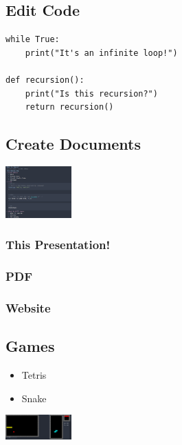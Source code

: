\documentclass[11pt]{article}
\begin{document}
\subsection*{Edit Code}
\label{sec:orgff2bdde}
\begin{verbatim}
while True:
    print("It's an infinite loop!")

def recursion():
    print("Is this recursion?")
    return recursion()
\end{verbatim}
\subsection*{Create Documents}
\label{sec:org5b7b97a}
\begin{center}
\includegraphics[width=1in]{org-mode.png}
\end{center}
\subsubsection*{This Presentation!}
\label{sec:orgefb077c}
\subsubsection*{PDF}
\label{sec:orgfba011c}
\subsubsection*{Website}
\label{sec:orgdbd241a}
\subsection*{Games}
\label{sec:orgc2afbc5}
\begin{itemize}
\item Tetris
\item Snake
\end{itemize}
\begin{center}
\includegraphics[width=1in]{snake.png}
\end{center}
\end{document}

